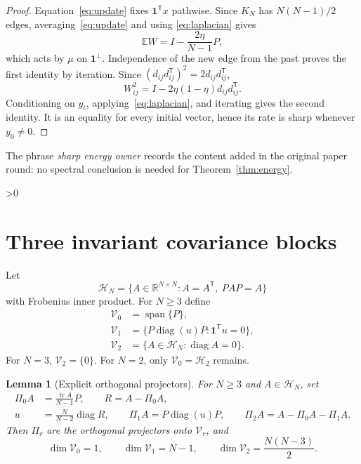 \documentclass[10pt]{article}
\providecommand{\CRevisionRound}{2}
\newtheorem{lemma}[theorem]{Lemma}
\newcommand{\EE}{\mathbb E}
\newcommand{\one}{\mathbf 1}
\begin{document}
\begin{proof}
Equation~\eqref{eq:update} fixes $\one^{\mathsf T}x$ pathwise.  Since
$K_N$ has $N(N-1)/2$ edges, averaging~\eqref{eq:update} and using
\eqref{eq:laplacian} gives
\[
 \EE W=I-\frac{2\eta}{N-1}P,
\]
which acts by $\mu$ on $\one^\perp$.  Independence of the new edge from the
past proves the first identity by iteration.  Since
$(d_{ij}d_{ij}^{\mathsf T})^2=2d_{ij}d_{ij}^{\mathsf T}$,
\[
 W_{ij}^2=I-2\eta(1-\eta)d_{ij}d_{ij}^{\mathsf T}.
\]
Conditioning on $y_t$, applying~\eqref{eq:laplacian}, and iterating gives the
second identity.  It is an equality for every initial vector, hence its
rate is sharp whenever $y_0\ne0$.
\end{proof}

The phrase \emph{sharp energy owner} records the content added in the
original paper round: no spectral conclusion is needed for
Theorem~\ref{thm:energy}.

\ifnum\CRevisionRound>0
\section{Three invariant covariance blocks}
Let
\[
 \mathscr H_N=\{A\in\mathbb R^{N\times N}:A=A^{\mathsf T},\ PAP=A\}
\]
with Frobenius inner product.  For $N\geq3$ define
\begin{align*}
 \mathscr V_0&=\operatorname{span}\{P\},\\
 \mathscr V_1&=\{P\operatorname{diag}(u)P:\one^{\mathsf T}u=0\},\\
 \mathscr V_2&=\{A\in\mathscr H_N:\operatorname{diag}A=0\}.
\end{align*}
For $N=3$, $\mathscr V_2=\{0\}$.  For $N=2$, only
$\mathscr V_0=\mathscr H_2$ remains.

\begin{lemma}[Explicit orthogonal projectors]\label{lem:projectors}
For $N\geq3$ and $A\in\mathscr H_N$, set
\begin{align}\label{eq:projectors}
 \Pi_0A&=\frac{\operatorname{tr}A}{N-1}P,\qquad R=A-\Pi_0A,\nonumber\\
 u&=\frac{N}{N-2}\operatorname{diag}R,\qquad
 \Pi_1A=P\operatorname{diag}(u)P,\qquad
 \Pi_2A=A-\Pi_0A-\Pi_1A.
\end{align}
Then $\Pi_r$ are the orthogonal projectors onto $\mathscr V_r$, and
\begin{equation}\label{eq:dimensions}
 \dim\mathscr V_0=1,\qquad \dim\mathscr V_1=N-1,\qquad
 \dim\mathscr V_2=\frac{N(N-3)}2.
\end{equation}
\end{lemma}
\end{document}
